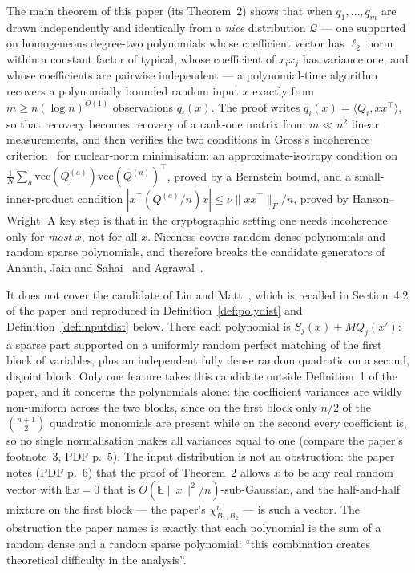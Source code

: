 \documentclass{aicr-conjecture}
\newcommand{\EE}{\mathbb{E}}
\newcommand{\cQ}{\mathcal{Q}}
\newcommand{\MQ}{\mathit{MQ}}
\begin{document}
The main theorem of this paper (its Theorem~2) shows that when
$q_1, \dots, q_m$ are drawn independently and identically from a
\emph{nice} distribution $\cQ$ --- one supported on homogeneous
degree-two polynomials whose coefficient vector has $\ell_2$ norm
within a constant factor of typical, whose coefficient of $x_i x_j$ has
variance one, and whose coefficients are pairwise independent --- a
polynomial-time algorithm recovers a polynomially bounded random input
$x$ exactly from $m \ge n(\log n)^{O(1)}$ observations $q_i(x)$. The
proof writes $q_i(x) = \langle Q_i, xx^{\top} \rangle$, so that
recovery becomes recovery of a rank-one matrix from $m \ll n^2$ linear
measurements, and then verifies the two conditions in Gross's
incoherence criterion~\cite{Gross} for nuclear-norm minimisation: an
approximate-isotropy condition on
$\frac{1}{N}\sum_a \mathrm{vec}(Q^{(a)})\mathrm{vec}(Q^{(a)})^{\top}$,
proved by a Bernstein bound, and a small-inner-product condition
$|x^{\top}(Q^{(a)}/n)x| \le \nu \|xx^{\top}\|_F / n$, proved by
Hanson--Wright. A key step is that in the cryptographic setting one
needs incoherence only for \emph{most} $x$, not for all $x$. Niceness
covers random dense polynomials and random sparse polynomials, and
therefore breaks the candidate generators of Ananth, Jain and
Sahai~\cite{AJS} and Agrawal~\cite{Agr18}.

It does not cover the candidate of Lin and Matt~\cite{LM}, which is
recalled in Section~4.2 of the paper and reproduced in
Definition~\ref{def:polydist} and Definition~\ref{def:inputdist} below.
There each polynomial is $S_j(x) + \MQ_j(x')$: a sparse part supported
on a uniformly random perfect matching of the first block of variables,
plus an independent fully dense random quadratic on a second, disjoint
block. Only one feature takes this candidate outside Definition~1 of
the paper, and it concerns the polynomials alone: the coefficient
variances are wildly non-uniform across the two blocks, since on the
first block only $n/2$ of the $\binom{n+1}{2}$ quadratic monomials are
present while on the second every coefficient is, so no single
normalisation makes all variances equal to one (compare the paper's
footnote~3, PDF p.~5). The input distribution is not an obstruction:
the paper notes (PDF p.~6) that the proof of Theorem~2 allows $x$ to be
any real random vector with $\EE x = 0$ that is
$O(\EE\|x\|^2/n)$-sub-Gaussian, and the half-and-half mixture on the
first block --- the paper's $\chi_{B_1, B_2}^{n}$ --- is such a vector.
The obstruction the paper names is exactly that each polynomial is the
sum of a random dense and a random sparse polynomial: ``this
combination creates theoretical difficulty in the analysis''.
\end{document}
